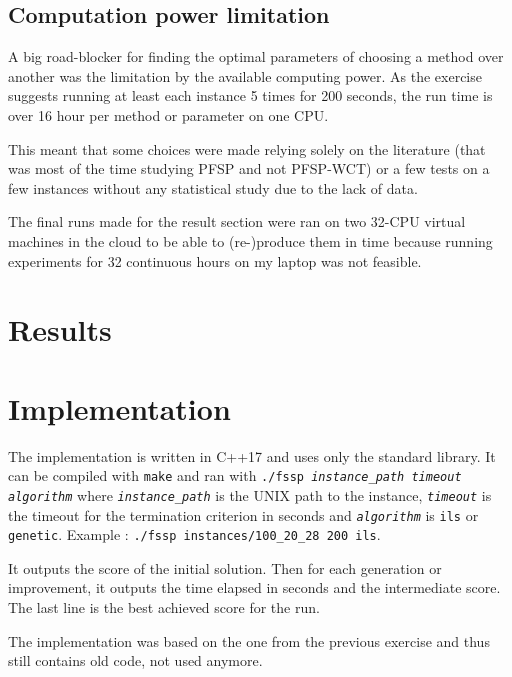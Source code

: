 \documentclass[a4paper]{article}
\begin{document}
\subsection{Computation power limitation}
\label{power}

A big road-blocker for finding the optimal parameters of choosing a method over another was the limitation by the available computing power. As the exercise suggests running at least each instance 5 times for 200 seconds, the run time is over 16 hour per method or parameter on one CPU.

This meant that some choices were made relying solely on the literature (that was most of the time studying PFSP and not PFSP-WCT) or a few tests on a few instances without any statistical study due to the lack of data.

The final runs made for the result section were ran on two 32-CPU virtual machines in the cloud to be able to (re-)produce them in time because running experiments for 32 continuous hours on my laptop was not feasible.

\section{Results}


\section{Implementation}

The implementation is written in C++17 and uses only the standard library. It can be compiled with \texttt{make} and ran with \texttt{./fssp \textit{instance\_path timeout algorithm}} where \texttt{\textit{instance\_path}} is the UNIX path to the instance, \texttt{\textit{timeout}} is the timeout for the termination criterion in seconds and \texttt{\textit{algorithm}} is \texttt{ils} or \texttt{genetic}.
Example : \texttt{./fssp instances/100\_20\_28 200 ils}.

It outputs the score of the initial solution. Then for each generation or improvement, it outputs the time elapsed in seconds and the intermediate score. The last line is the best achieved score for the run.

The implementation was based on the one from the previous exercise and thus still contains old code, not used anymore.




\end{document}
